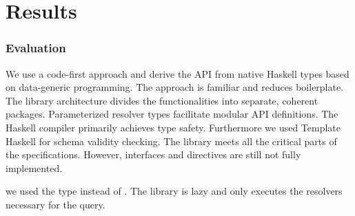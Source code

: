 \section{Results}

\begin{frame}\frametitle{Evaluation}

\begin{itemize}
   We use a code-first approach and derive the API from native Haskell types based on data-generic programming. The approach is familiar and reduces boilerplate. The library architecture divides the functionalities into separate, coherent packages. Parameterized resolver types facilitate modular API definitions.
   The Haskell compiler primarily achieves type safety. Furthermore we used Template Haskell for schema validity checking. The library meets all the critical parts of the specifications. However, interfaces and directives are still not fully implemented. 

   we used the type  instead of . The library is lazy and only executes the resolvers necessary for the query. 

\end{itemize}
\end{frame}

